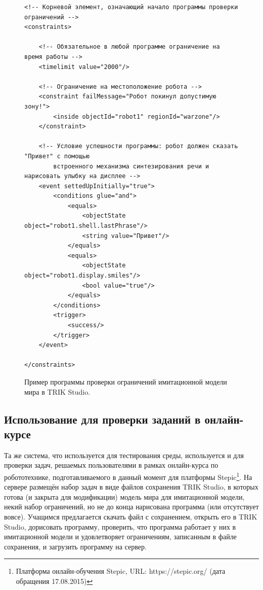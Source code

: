 \documentclass[conference]{IEEEtran}
\begin{document}
\begin{figure}[!t]
\begin{verbatim}
<!-- Корневой элемент, означающий начало программы проверки ограничений -->
<constraints>

    <!-- Обязательное в любой программе ограничение на время работы -->
    <timelimit value="2000"/>

    <!-- Ограничение на местоположение робота -->
    <constraint failMessage="Робот покинул допустимую зону!">
        <inside objectId="robot1" regionId="warzone"/>
    </constraint>

    <!-- Условие успешности программы: робот должен сказать "Привет" с помощью
        встроенного механизма синтезирования речи и нарисовать улыбку на дисплее -->
    <event settedUpInitially="true">
        <conditions glue="and">
            <equals>
                <objectState object="robot1.shell.lastPhrase"/>
                <string value="Привет"/>
            </equals>
            <equals>
                <objectState object="robot1.display.smiles"/>
                <bool value="true"/>
            </equals>
        </conditions>
        <trigger>
            <success/>
        </trigger>
    </event>

</constraints>
\end{verbatim}
\caption{Пример программы проверки ограничений имитационной модели мира в TRIK Studio.}
\label{code:constraints}
\end{figure}

\subsection{Использование для проверки заданий в онлайн-курсе}
Та же система, что используется для тестирования среды, используется и для проверки задач, решаемых пользователями 
в рамках онлайн-курса по робототехнике, подготавливаемого в данный момент для платформы Stepic\footnote{Платформа онлайн-обучения Stepic, URL: https://stepic.org/ (дата обращения 17.08.2015)}.
На сервере размещён набор задач в виде файлов сохранения TRIK Studio, в которых готова (и закрыта для модификации) модель 
мира для имитационной модели, некий набор ограничений, но не до конца нарисована программа (или отсутствует вовсе). 
Учащимся предлагается скачать файл с сохранением, открыть его в TRIK Studio, дорисовать программу, проверить, 
что программа работает у них в имитационной модели и удовлетворяет ограничениям, записанным в файле сохранения, 
и загрузить программу на сервер.
\end{document}
